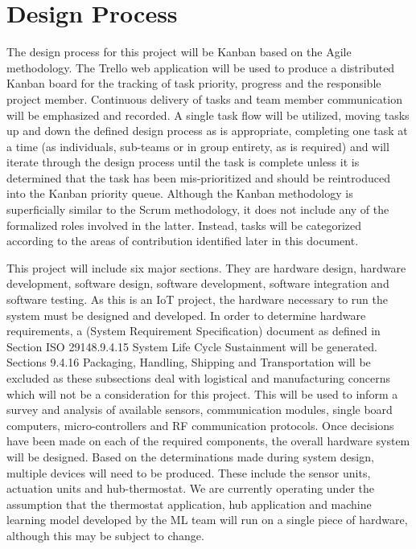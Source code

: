 \documentclass{article}
\begin{document}
\pagebreak
\section{Design Process}

The design process for this project will be Kanban based on the Agile methodology. The Trello web application will be used to produce a distributed Kanban board for the tracking of task priority, progress and the responsible project member. Continuous delivery of tasks and team member communication will be emphasized and recorded. A single task flow will be utilized, moving tasks up and down the defined design process as is appropriate, completing one task at a time (as individuals, sub-teams or in group entirety, as is required) and will iterate through the design process until the task is complete unless it is determined that the task has been mis-prioritized and should be reintroduced into the Kanban priority queue. Although the Kanban methodology is superficially similar to the Scrum methodology, it does not include any of the formalized roles involved in the latter. Instead, tasks will be categorized according to the areas of contribution identified later in this document.

This project will include six major sections. They are hardware design, hardware development, software design, software development, software integration and software testing. As this is an IoT project, the hardware necessary to run the system must be designed and developed. In order to determine hardware requirements, a (System Requirement Specification) document as defined in Section \gls{ISO} 29148.9.4.15 System Life Cycle Sustainment will be generated. Sections 9.4.16 Packaging, Handling, Shipping and Transportation will be excluded as these subsections deal with logistical and manufacturing concerns which will not be a consideration for this project. This will be used to inform a survey and analysis of available sensors, communication modules, single board computers, micro-controllers and RF communication protocols. Once decisions have been made on each of the required components, the overall hardware system will be designed. Based on the determinations made during system design, multiple devices will need to be produced. These include the sensor units, actuation units and hub-thermostat. We are currently operating under the assumption that the thermostat application, hub application and machine learning model developed by the ML team will run on a single piece of hardware, although this may be subject to change.
\end{document}
